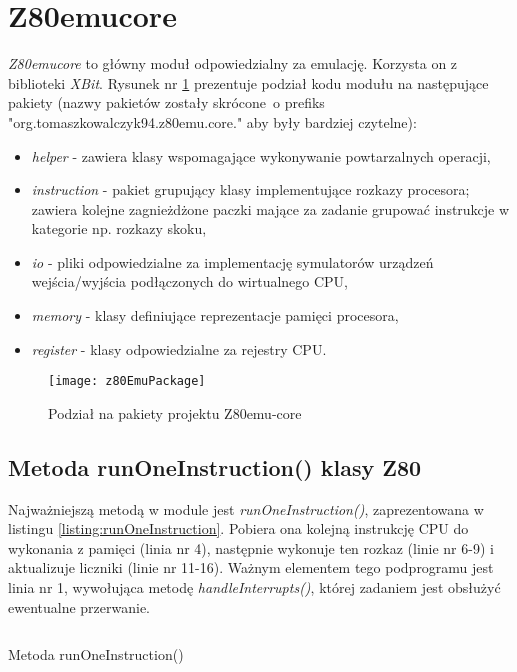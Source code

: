 \section{Z80emu{\dywiz}core}

\emph{Z80emu{\dywiz}core} to główny moduł odpowiedzialny za emulację. Korzysta on z biblioteki \emph{XBit}. Rysunek nr \ref{img:z80EmuPackage} prezentuje podział kodu modułu na następujące pakiety (nazwy pakietów zostały skrócone~o prefiks "org.tomaszkowalczyk94.z80emu.core." aby były bardziej czytelne):

\begin{itemize}  
    \item \emph{helper} - zawiera klasy wspomagające wykonywanie powtarzalnych operacji,
    \item \emph{instruction} - pakiet grupujący klasy implementujące rozkazy procesora; zawiera kolejne zagnieżdżone paczki mające za zadanie grupować instrukcje w kategorie np. rozkazy skoku,
    \item \emph{io} - pliki odpowiedzialne za implementację symulatorów urządzeń wejścia/wyjścia podłączonych do wirtualnego CPU,
    \item \emph{memory} - klasy definiujące reprezentacje pamięci procesora,
    \item \emph{register} - klasy odpowiedzialne za rejestry CPU.
\end{itemize}


\begin{figure}[h]
		\centering
		\texttt{[image: z80EmuPackage]}
		\caption{Podział na pakiety projektu Z80emu-core}
		\label{img:z80EmuPackage}
\end{figure}

\subsection{Metoda runOneInstruction() klasy Z80}
Najważniejszą metodą w module jest \emph{runOneInstruction()}, zaprezentowana w listingu \ref{listing:runOneInstruction}. Pobiera ona kolejną instrukcję CPU do wykonania z pamięci (linia nr 4), następnie wykonuje ten rozkaz (linie nr 6-9) i aktualizuje liczniki (linie nr 11-16). Ważnym elementem tego podprogramu jest linia nr 1,  wywołująca metodę \emph{handleInterrupts()}, której zadaniem jest obsłużyć ewentualne przerwanie.

\begin{listing}[h]
	\inputminted{java}{listings/z80emu-core/runOneInstruction.java}
	\caption{Metoda runOneInstruction()}
	\label{listing:runOneInstruction}
\end{listing}

